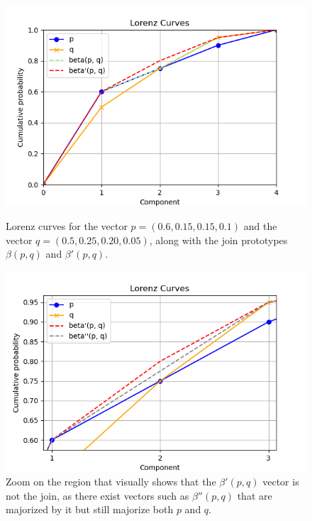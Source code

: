 \begin{figure}[h!]
    \centering
    \begin{minipage}{.48\textwidth}
        \centering
        \includegraphics[scale=0.48]{images/join_first_attempt.png}
        \caption{Lorenz curves for the vector $p = (0.6, 0.15, 0.15, 0.1)$ and the vector $q = (0.5, 0.25, 0.20, 0.05)$, along with the join prototypes $\beta(p, q)$ and $\beta'(p, q)$.}
        \label{fig:first_join_attempt}
    \end{minipage}
    \hfill
    \begin{minipage}{0.48\textwidth} 
        \centering
        \includegraphics[scale=0.48]{images/join_second_attempt.png}
        \caption{Zoom on the region that visually shows that the $\beta'(p, q)$ vector is not the join, as there exist vectors such as $\beta''(p, q)$ that are majorized by it but still majorize both $p$ and $q$.} 
        \label{fig:second_join_attempt}
    \end{minipage}
\end{figure}

